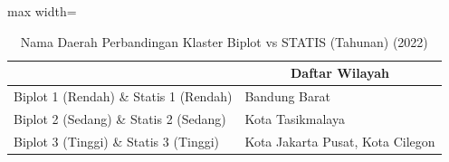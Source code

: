 \begin{table}[H]
\centering
\caption{Nama Daerah Perbandingan Klaster Biplot vs STATIS (Tahunan) (2022)} \label{tab:sample1biplot_statis_comp_name_2022}
\begin{adjustbox}{max width=\textwidth}
\begin{tabular}{|>{\centering\arraybackslash}p{4cm}|p{10cm}|}
\hline
\multicolumn{1}{|c|}{\textbf{Kategori}} & \multicolumn{1}{c|}{\textbf{Daftar Wilayah}} \\
\hline
Biplot 1 (Rendah) \& Statis 1 (Rendah) & Bandung Barat \\
\hline
Biplot 2 (Sedang) \& Statis 2 (Sedang) & Kota Tasikmalaya \\
\hline
Biplot 3 (Tinggi) \& Statis 3 (Tinggi) & Kota Jakarta Pusat, Kota Cilegon \\
\hline
\end{tabular}
\end{adjustbox}
\end{table}